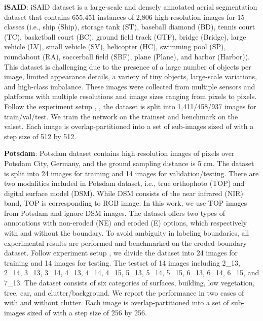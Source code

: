 \documentclass[journal]{IEEEtran}
\begin{document}
\noindent\textbf{iSAID}: iSAID dataset \cite{Waqas2019} is a large-scale and densely annotated aerial segmentation dataset that contains 655,451 instances of 2,806 high-resolution images for 15 classes (i.e., ship (Ship), storage tank (ST), baseball diamond (BD), tennis court (TC), basketball court (BC), ground field track (GTF), bridge (Bridge), large vehicle (LV), small vehicle (SV), helicopter (HC), swimming pool (SP), roundabout (RA), soccerball field (SBF), plane (Plane), and harbor (Harbor)). This dataset is challenging due to the presence of a large number of objects per image, limited appearance details, a variety of tiny objects, large-scale variations, and high-class imbalance. These images were collected from multiple sensors and platforms with multiple resolutions and image sizes ranging from  pixels to   pixels. Follow the experiment setup \cite{zheng2020foreground}, \cite{li2021pointflow}, the dataset is split into 1,411/458/937 images for train/val/test. We train the network on the trainset and benchmark on the valset. Each image is overlap-partitioned into a set of sub-images sized of  with a step size of 512 by 512. 







\noindent\textbf{Potsdam}: Potsdam dataset \cite{potsdam} contains  high resolution images of  pixels over Potsdam City, Germany, and the ground sampling distance is 5 cm. The dataset is split into 24 images for training and 14 images for validation/testing. There are two modalities included in Potsdam dataset, i.e., true orthophoto (TOP) and digital surface model (DSM). While DSM consists of the near infrared (NIR) band, TOP is corresponding to RGB image. In this work, we use TOP images from Potsdam and ignore DSM images. 
The dataset offers two types of annotations with non-eroded (NE) and eroded (E) options, which respectively with and without the boundary. To avoid ambiguity in labeling boundaries, all experimental results are performed and benchmarked on the eroded boundary dataset. 
Follow experiment setup \cite{he2022swin}, \cite{wang2022empirical} we divide the dataset into 24 images for training and 14 images for testing. The testset of 14 images including 2\_13, 2\_14, 3\_13, 3\_14, 4\_13, 4\_14, 4\_15, 5\_13, 5\_14, 5\_15, 6\_13, 6\_14, 6\_15, and 7\_13. The dataset consists of six categories of surfaces, building, low vegetation, tree, car, and clutter/background. We report the performance in two cases of with and without clutter. Each image is overlap-partitioned into a set of sub-images sized of  with a step size of 256 by 256. 
\end{document}
